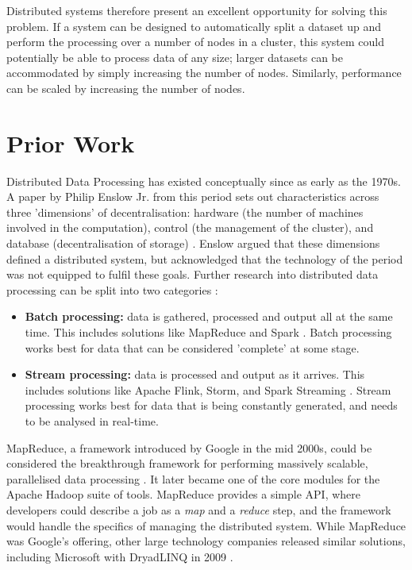Distributed systems therefore present an excellent opportunity for solving this problem. If a system can be designed to automatically split a dataset up and perform the processing over a number of nodes in a cluster, this system could potentially be able to process data of any size; larger datasets can be accommodated by simply increasing the number of nodes. Similarly, performance can be scaled by increasing the number of nodes.


\section{Prior Work}
Distributed Data Processing has existed conceptually since as early as the 1970s. A paper by Philip Enslow Jr{\frenchspacing.} from this period sets out characteristics across three 'dimensions' of decentralisation: hardware (the number of machines involved in the computation), control (the management of the cluster), and database (decentralisation of storage) \cite{enslow1978distributed}. Enslow argued that these dimensions defined a distributed system, but acknowledged that the technology of the period was not equipped to fulfil these goals. Further research into distributed data processing can be split into two categories \cite{yaqoob2016big}:
\begin{itemize}
	\item \textbf{Batch processing:} data is gathered, processed and output all at the same time. This includes solutions like MapReduce and Spark \cite{dean2008mapreduce, zaharia2016spark}. Batch processing works best for data that can be considered 'complete' at some stage.
	\item \textbf{Stream processing:} data is processed and output as it arrives. This includes solutions like Apache Flink, Storm, and Spark Streaming \cite{carbone2015flink, toshniwal2014storm, armbrust2018sparkstreaming}. Stream processing works best for data that is being constantly generated, and needs to be analysed in real-time.
\end{itemize}

MapReduce, a framework introduced by Google in the mid 2000s, could be considered the breakthrough framework for performing massively scalable, parallelised data processing \cite{dean2008mapreduce}. It later became one of the core modules for the Apache Hadoop suite of tools. MapReduce provides a simple API, where developers could describe a job as a \textit{map} and a \textit{reduce} step, and the framework would handle the specifics of managing the distributed system. While MapReduce was Google's offering, other large technology companies released similar solutions, including Microsoft with DryadLINQ in 2009 \cite{fetterly2009dryadlinq}.

